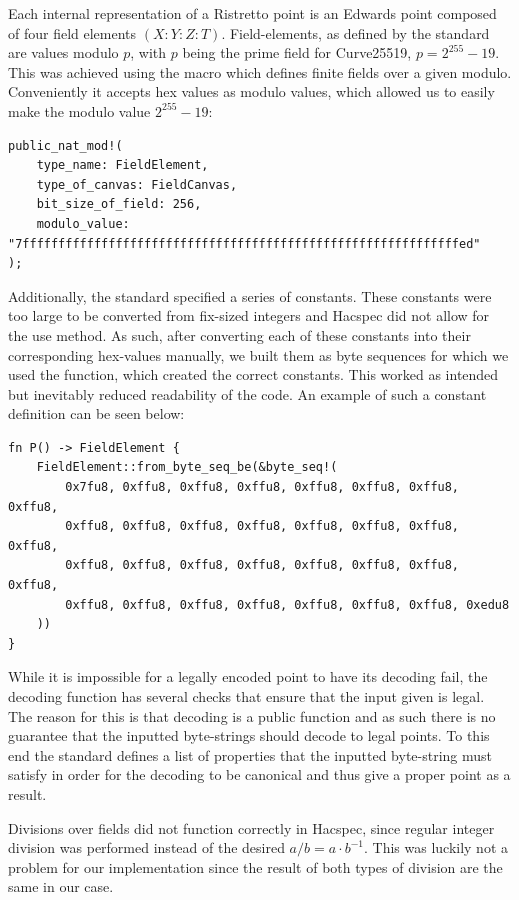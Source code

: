 \documentclass{article}
\newcommand*\ttvar[1]{\texttt{\expandafter\dottvar\detokenize{#1}\relax}}
\newcommand*\dottvar[1]{\ifx\relax#1\else
  \expandafter\ifx\string_#1\string_\allowbreak\else#1\fi
  \expandafter\dottvar\fi}
\begin{document}
Each internal representation of a Ristretto point is an Edwards point
composed of four field elements $(X : Y : Z : T)$. Field-elements,
as defined by the standard are values modulo $p$, with $p$ being the
prime field for Curve25519, $p = 2^{255} - 19$. This was achieved using
the \ttvar{public_nat_mod!()} macro which defines finite fields over
a given modulo. Conveniently it accepts hex values as modulo values,
which allowed us to easily make the modulo value $2^{255} - 19$:

\begin{lstlisting}
public_nat_mod!(
	type_name: FieldElement,
	type_of_canvas: FieldCanvas,
	bit_size_of_field: 256,
	modulo_value: "7fffffffffffffffffffffffffffffffffffffffffffffffffffffffffffffed"
);
\end{lstlisting}

Additionally, the standard specified a series of constants. These
constants were too large to be converted from fix-sized integers and
Hacspec did not allow for the use \ttvar{from_hex()} method. As such,
after converting each of these constants into their corresponding
hex-values manually, we built them as byte sequences for which we used the \ttvar{from_byte_seq_be()} function, which created the correct
constants. This worked as intended but inevitably reduced readability
of the code. An example of such a constant definition can be seen below:

\begin{lstlisting}
fn P() -> FieldElement {
	FieldElement::from_byte_seq_be(&byte_seq!(
		0x7fu8, 0xffu8, 0xffu8, 0xffu8, 0xffu8, 0xffu8, 0xffu8, 0xffu8,
		0xffu8, 0xffu8, 0xffu8, 0xffu8, 0xffu8, 0xffu8, 0xffu8, 0xffu8,
		0xffu8, 0xffu8, 0xffu8, 0xffu8, 0xffu8, 0xffu8, 0xffu8, 0xffu8,
		0xffu8, 0xffu8, 0xffu8, 0xffu8, 0xffu8, 0xffu8, 0xffu8, 0xedu8
	))
}
\end{lstlisting}

While it is impossible for a legally encoded point to have its
decoding fail, the decoding function has several checks that ensure
that the input given is legal. The reason for this is that decoding is
a public function and as such there is no guarantee that the inputted
byte-strings should decode to legal points. To this end the standard
defines a list of properties that the inputted byte-string must satisfy
in order for the decoding to be canonical and thus give a proper point
as a result.

Divisions over fields did not function correctly in Hacspec, since
regular integer division was performed instead of the desired $a/b =
a \cdot b^{-1}$. This was luckily not a problem for our implementation
since the result of both types of division are the same in our case.
\end{document}
